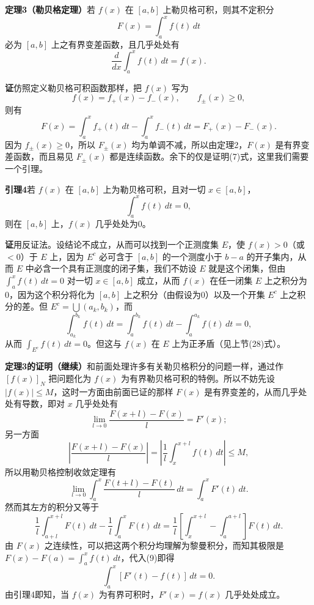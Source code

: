 \noindent\textbf{定理3（勒贝格定理）}\quad 若 $f(x)$ 在 $[a,b]$ 上勒贝格可积，则其不定积分
\[
 F(x)=\int_a^x f(t)\,dt
\]
必为 $[a,b]$ 上之有界变差函数，且几乎处处有
\begin{equation}
 \frac{d}{dx}\int_a^x f(t)\,dt=f(x).
 \tag{7}
\end{equation}

\noindent\textbf{证}\quad 仿照定义勒贝格可积函数那样，把 $f(x)$ 写为
\[
 f(x)=f_+(x)-f_-(x),\qquad f_\pm(x)\ge0,
\]
则有
\[
 F(x)=\int_a^x f_+(t)\,dt-\int_a^x f_-(t)\,dt=F_+(x)-F_-(x).
\]
因为 $f_\pm(x)\ge0$，所以 $F_\pm(x)$ 均为单调不减，所以由定理2，$F(x)$ 是有界变差函数，而且易见 $F_\pm(x)$ 都是连续函数。余下的仅是证明(7)式，这里我们需要一个引理。

\noindent\textbf{引理4}\quad 若 $f(x)$ 在 $[a,b]$ 上为勒贝格可积，且对一切 $x\in[a,b]$，
\[
 \int_a^x f(t)\,dt=0,
\]
则在 $[a,b]$ 上，$f(x)$ 几乎处处为0。

\noindent\textbf{证}\quad 用反证法。设结论不成立，从而可以找到一个正测度集 $E$，使 $f(x)>0$（或 $<0$）于 $E$ 上，因为 $E^c$ 必可含于 $[a,b]$ 的一个测度小于 $b-a$ 的开子集内，从而 $E$ 中必含一个具有正测度的闭子集，我们不妨设 $E$ 就是这个闭集，但由 $\int_a^x f(t)\,dt=0$ 对一切 $x\in[a,b]$ 成立，从而 $f(x)$ 在任一闭集 $E$ 上之积分为0，因为这个积分将化为 $[a,b]$ 上之积分（由假设为0）以及一个开集 $E^c$ 上之积分的差。但 $E^c=\bigcup(a_k,b_k)$，而
\[
 \int_{a_k}^{b_k}f(t)\,dt=\int_a^{b_k}f(t)\,dt-\int_a^{a_k}f(t)\,dt=0,
\]
从而 $\int_{E^c}f(t)\,dt=0$。但这与 $f(x)$ 在 $E$ 上为正矛盾（见上节(28)式）。

\noindent\textbf{定理3的证明（继续）}\quad 和前面处理许多有关勒贝格积分的问题一样，通过作 $[f(x)]_N$ 把问题化为 $f(x)$ 为有界勒贝格可积的特例。所以不妨先设 $|f(x)|\le M$，这时一方面由前面已证的那样 $F(x)$ 是有界变差的，从而几乎处处有导数，即对 $x$ 几乎处处有
\begin{equation}
 \lim_{l\to0}\frac{F(x+l)-F(x)}{l}=F'(x);
 \tag{8}
\end{equation}
另一方面
\[
 \left|\frac{F(x+l)-F(x)}{l}\right|
 =\left|\frac1l\int_x^{x+l}f(t)\,dt\right|\le M,
\]
所以用勒贝格控制收敛定理有
\begin{equation}
 \lim_{l\to0}\int_a^x\frac{F(t+l)-F(t)}{l}\,dt
 =\int_a^xF'(t)\,dt.
 \tag{9}
\end{equation}
然而其左方的积分又等于
\[
 \frac1l\int_{a+l}^{x+l}F(t)\,dt-\frac1l\int_a^xF(t)\,dt
 =\frac1l\left[\int_x^{x+l}-\int_a^{a+l}\right]F(t)\,dt.
\]
由 $F(x)$ 之连续性，可以把这两个积分均理解为黎曼积分，而知其极限是 $F(x)-F(a)=\int_a^x f(t)\,dt$，代入(9)即得
\[
 \int_a^x[F'(t)-f(t)]\,dt=0.
\]
由引理4即知，当 $f(x)$ 为有界可积时，$F'(x)=f(x)$ 几乎处处成立。

